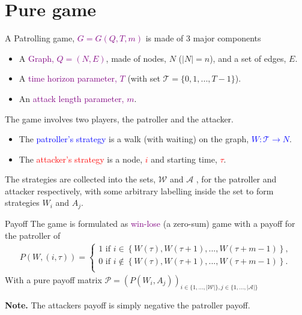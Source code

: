 \documentclass[11pt]{beamer}
\begin{document}
\section[]{Pure game}
\hypertarget{Introduction to game: Pure game}{}
\begin{frame}{\insertsection}

A Patrolling game, \textcolor{purple}{$G=G(Q,T,m)$} is made of 3 major components
\begin{itemize}
\item A \textcolor{purple}{Graph, $Q=(N,E)$}, made of nodes, $N$ ($|N|=n$), and a set of edges, $E$.
\item A \textcolor{purple}{time horizon parameter, $T$} (with set $\mathcal{T}=\{0,1,...,T-1\}$).
\item An \textcolor{purple}{attack length parameter, $m$}.
\end{itemize}

\pause

The game involves two players, the patroller and the attacker.
\begin{itemize}
\item The \textcolor{blue}{patroller's strategy} is a walk (with waiting) on the graph, \textcolor{blue}{$W:\mathcal{T} \rightarrow  N$}.
\item The \textcolor{red}{attacker's strategy} is a node, \textcolor{red}{$i$} and starting time, \textcolor{red}{$\tau$}.
\end{itemize} 
The strategies are collected into the sets, $\mathcal{W}$ and $\mathcal{A}$ , for the patroller and attacker respectively, with some arbitrary labelling inside the set to form strategies $W_{i}$ and $A_{j}$.

\end{frame}

\begin{frame}{Payoff}
The game is formulated as \textcolor{purple}{win-lose} (a zero-sum) game with a payoff for the patroller of
\begin{align*}
P(W,(i,\tau))=\left\{ \begin{array}{l}
1 \text{  if  } i \in \left\{ W(\tau),W(\tau+1),...,W(\tau+m-1) \right\} ,\\
0 \text{  if  } i \notin \left\{ W(\tau),W(\tau+1),...,W(\tau+m-1) \right\} .\\
\end{array}\right.
\end{align*}
With a pure payoff matrix $\mathcal{P}=(P(W_{i},A_{j}))_{i \in \{ 1,...,|\mathcal{W}| \}, j \in \{ 1,...,|\mathcal{A}| \}}$


\textbf{Note.} The attackers payoff is simply negative the patroller payoff.
\end{frame}
\end{document}
